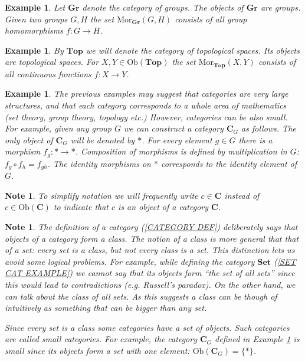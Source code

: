\documentclass[11pt, letterpaper, oneside]{report}
\theoremstyle{pplain}
\theoremstyle{ddefinition}
\newtheorem{example}[theorem]{Example}
\newtheorem{note}[theorem]{Note}
\theoremstyle{nnn}
\theoremstyle{eexercise}
\newcommand{\Mor}{\mathrm{Mor}}
\newcommand{\Ob}{\mathrm{Ob}}
\newcommand{\CC}{{\mathbf C}}
\newcommand{\Gr}{{\mathbf{Gr}}}
\newcommand{\Top}{{\mathbf{Top}}}
\newcommand{\Set}{{\mathbf{Set}}}
\begin{document}
\begin{example}
Let  $\Gr$ denote the category of groups. The objects of $\Gr$ are groups. Given two groups $G, H$
the set $\Mor_{\Gr}(G, H)$ consists of all group homomorphisms $f\colon G \to H$.  
\end{example}

\begin{example}
By  $\Top$ we will denote the category of topological spaces. Its objects are  topological spaces. 
For $X, Y\in \Ob(\Top)$ the set $\Mor_{\Top}(X, Y)$ consists of all continuous functions $f\colon X\to Y$.  
\end{example}

\begin{example}
\label{SMALL CAT EXAMPLE}
The previous examples may suggest that categories are very large structures, and that each category 
corresponds to a whole area of mathematics (set theory, group theory, topology etc.) However, categories 
can be also small. For example, given any group $G$ we can construct a category $\CC_{G}$ as follows. 
The only object of $\CC_{G}$ will be denoted by $\ast$. For every element $g\in G$ there is a morphism 
$f_{g}\colon \ast \to \ast$. Composition of morphisms is defined by multiplication in $G$: 
$f_{g}\circ f_{h} = f_{gh}$. The identity morphisms on $\ast$ corresponds to the identity element of $G$. 

\end{example}


\begin{note}
To simplify  notation we will frequently write $c\in \CC$ instead of $c\in \text{Ob}(\CC)$ to indicate that 
$c$ is an object of a category $\CC$. 
\end{note}

\begin{note}
The definition of a category (\ref{CATEGORY DEF}) deliberately says that objects of a category 
form a \emph{class}. The notion of a class is more general that that of a set: every set is a class, but 
not every class is a set. This distinction lets us avoid some logical problems. For example, while defining 
the category $\Set$ (\ref{SET CAT EXAMPLE}) we cannot say that its objects form ``the set of all sets'' since
this would lead to contradictions (e.g. Russell's paradox). On the other hand, we can talk about the 
class of all sets. As this suggests a class can be though of intuitively as something that can be bigger 
than any set. 

Since every set is a class some categories have a set of objects. Such categories 
are called \emph{small categories}. For example, the category $\CC_{G}$ defined in 
Example \ref{SMALL CAT EXAMPLE} is small since its objects form a set with one element: 
$\Ob(\CC_{G}) = \{\ast \}$.  

\end{note}
\end{document}
